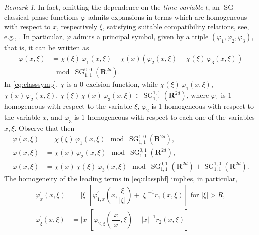 \documentclass[12pt,a4paper,reqno]{amsart}
\numberwithin{equation}{section}
\numberwithin{thm}{section}
\theoremstyle{definition}
\theoremstyle{remark}
\newtheorem{rem}[thm]{Remark}
\begin{document}
\begin{rem}
In fact, omitting the dependence on the \emph{time variable $t$},
an ${\operatorname{SG}}$-classical phase functions $\varphi$ admits expansions in
terms which are homogeneous with respect to
$x$, respectively $\xi$, satisfying suitable compatibility relations, see, e.g.,
\cite{CoMa, CoPa}. In particular, $\varphi$ admits a principal
symbol, given by a triple $(\varphi_1,\varphi_2,\varphi_3)$, that is,
it can be written as
\begin{equation}
	\label{eq:classsymp}
	\begin{aligned}
	\varphi (x,\xi )&=\chi (\xi )\,\varphi _1(x,\xi )+\chi (x)(\varphi _2(x,\xi )
	-\chi (\xi )\,\varphi _3(x,\xi ))
	\\
	&\mod {\operatorname{SG}}^{0,0}_{1,1}({\mathbf R^{{2d}}}).
	\end{aligned}
\end{equation}
In \eqref{eq:classsymp}, $\chi$ is a $0$-excision function, while 
$\chi (\xi )\,\varphi _1(x,\xi )$, $\chi (x)\,\varphi_2(x,\xi )$, $\chi (\xi )\,
\chi (x)\,\varphi _3(x,\xi )\in {\operatorname{SG}}^{1,1}_{1,1}({\mathbf R^{{2d}}})$, where
$\varphi_1$ is $1$-homogeneous with respect to the variable $\xi$,
$\varphi_2$ is $1$-homogeneous with respect to the variable $x$,
and $\varphi_3$ is $1$-homogeneous with respect to each one of
the variables $x,\xi$. Observe that then
\begin{equation}
	\label{eq:classphf}
	\begin{aligned}
		\varphi(x,\xi)&=\chi(\xi)\,\varphi_1(x,\xi)\mod{\operatorname{SG}}^{1,0}_{1,1}({\mathbf R^{{2d}}}),
		\\[1ex]
		\varphi(x,\xi)&=\chi(x)\,\varphi_2(x,\xi)\mod{\operatorname{SG}}^{0,1}_{1,1}({\mathbf R^{{2d}}}),
		\\[1ex]
		\varphi(x,\xi)&=\chi(x)\,\chi(\xi)\,\varphi_3(x,\xi)\mod
		{\operatorname{SG}}^{0,1}_{1,1}({\mathbf R^{{2d}}})+{\operatorname{SG}}^{1,0}_{1,1}({\mathbf R^{{2d}}}).
	\end{aligned}
\end{equation}
The homogeneity of the leading terms in \eqref{eq:classphf} implies, in particular,
\begin{equation}
	\label{eq:classphfbis}
	\begin{aligned}
		\varphi^\prime_x(x,\xi)&=
		|\xi|\left[\varphi^\prime_{1,x}\left(x,\dfrac{\xi}{|\xi|}\right
		)+|\xi|^{-1}r_1(x,\xi)\right]
		\text{ for $|\xi|>R$},
	\\[1ex]
		\varphi^\prime_\xi(x,\xi)&=
		|x|\left[\varphi^\prime_{2,\xi}\left(\dfrac{x}{|x|},\xi\right)+|x|^{-1}r_2(x,\xi)\right]

\end{aligned}
\end{equation}
\end{rem}
\end{document}
